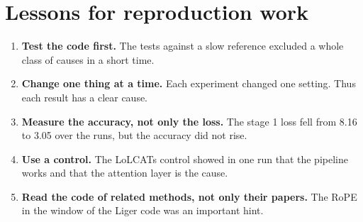 \section{Lessons for reproduction work}
\label{sec:lessons}

\begin{enumerate}
\item \textbf{Test the code first.} The tests against a slow reference excluded a whole class of causes in a short time.
\item \textbf{Change one thing at a time.} Each experiment changed one setting. Thus each result has a clear cause.
\item \textbf{Measure the accuracy, not only the loss.} The stage 1 loss fell from 8.16 to 3.05 over the runs, but the accuracy did not rise.
\item \textbf{Use a control.} The LoLCATs control showed in one run that the pipeline works and that the attention layer is the cause.
\item \textbf{Read the code of related methods, not only their papers.} The RoPE in the window of the Liger code was an important hint.
\end{enumerate}
